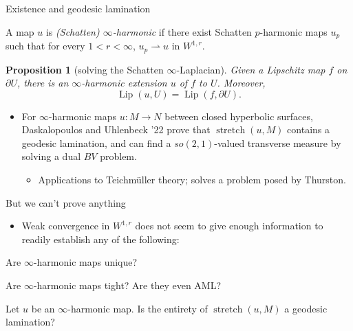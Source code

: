 \documentclass[10pt]{beamer}
\DeclareMathOperator{\Lip}{Lip}
\DeclareMathOperator{\Stretch}{stretch}
\newtheorem{proposition}{Proposition}
\begin{document}
\begin{frame}{Existence and geodesic lamination}
    
\begin{definition}
A map $u$ is \emph{(Schatten) $\infty$-harmonic} if there exist Schatten $p$-harmonic maps $u_p$ such that for every $1 < r < \infty$, $u_p \rightharpoonup u$ in $W^{1, r}$.
\end{definition}

\begin{proposition}[solving the Schatten $\infty$-Laplacian]
    Given a Lipschitz map $f$ on $\partial U$, there is an $\infty$-harmonic extension $u$ of $f$ to $U$.
    Moreover,
    $$\Lip(u, U) = \Lip(f, \partial U).$$
\end{proposition}

\begin{itemize}
    \item For $\infty$-harmonic maps $u: M \to N$ between closed hyperbolic surfaces, Daskalopoulos and Uhlenbeck '22 prove that $\Stretch(u, M)$ contains a geodesic lamination, and can find a $so(2, 1)$-valued transverse measure by solving a dual $BV$ problem.
    \begin{itemize}
        \item Applications to Teichm\"uller theory; solves a problem posed by Thurston.
    \end{itemize}
\end{itemize}
\end{frame}

\begin{frame}{But we can't prove anything}
\begin{itemize}
\item Weak convergence in $W^{1, r}$ does not seem to give enough information to readily establish any of the following:
\end{itemize}

\begin{problem}
Are $\infty$-harmonic maps unique?
\end{problem}

\begin{problem}
Are $\infty$-harmonic maps tight? Are they even AML?
\end{problem}

\begin{problem}
Let $u$ be an $\infty$-harmonic map. Is the entirety of $\Stretch(u, M)$ a geodesic lamination?
\end{problem}
\end{frame}
\end{document}
